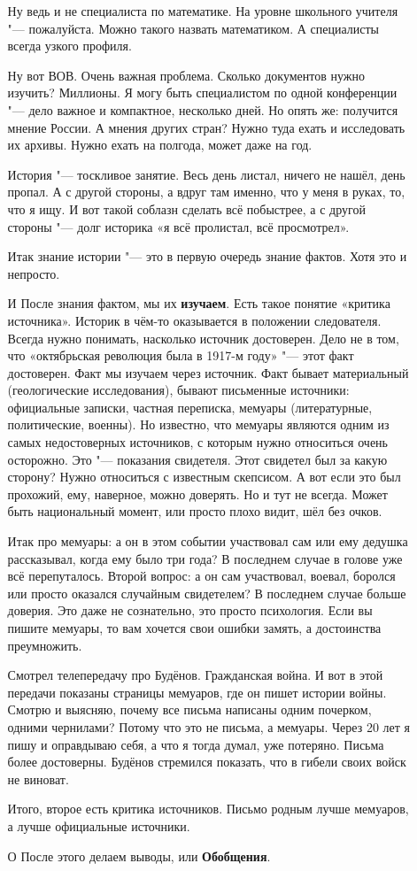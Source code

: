 \begin{enumerate}
\begin{itemize}
Ну ведь и не специалиста по математике. На уровне школьного учителя "--- пожалуйста. Можно такого назвать математиком. А специалисты всегда узкого профиля.

Ну вот ВОВ. Очень важная проблема. Сколько документов нужно изучить? Миллионы. Я могу быть специалистом по одной конференции "--- дело важное и компактное, несколько дней. Но опять же: получится мнение России. А мнения других стран? Нужно туда ехать и исследовать их архивы. Нужно ехать на полгода, может даже на год.

История "--- тоскливое занятие. Весь день листал, ничего не нашёл, день пропал. А с другой стороны, а вдруг там именно, что у меня в руках, то, что я ищу. И вот такой соблазн сделать всё побыстрее, а с другой стороны "--- долг историка «я всё пролистал, всё просмотрел».

Итак знание истории "--- это в первую очередь знание фактов. Хотя это и непросто.
\item[И] После знания фактом, мы их \textbf{изучаем}. Есть такое понятие «критика источника». Историк в чём-то оказывается в положении следователя. Всегда нужно понимать, насколько источник достоверен. Дело не в том, что «октябрьская революция была в 1917-м году» "--- этот факт достоверен. Факт мы изучаем через источник. Факт бывает материальный (геологические исследования), бывают письменные источники: официальные записки, частная переписка, мемуары (литературные, политические, военны). Но известно, что мемуары являются одним из самых недостоверных источников, с которым нужно относиться очень осторожно. Это "--- показания свидетеля. Этот свидетел был за какую сторону? Нужно относиться с известным скепсисом. А вот если это был прохожий, ему, наверное, можно доверять. Но и тут не всегда. Может быть национальный момент, или просто плохо видит, шёл без очков.

Итак про мемуары: а он в этом событии участвовал сам или ему дедушка рассказывал, когда ему было три года? В последнем случае в голове уже всё перепуталось. Второй вопрос: а он сам участвовал, воевал, боролся или просто оказался случайным свидетелем? В последнем случае больше доверия. Это даже не сознательно, это просто психология. Если вы пишите мемуары, то вам хочется свои ошибки замять, а достоинства преумножить.

Смотрел телепередачу про Будёнов. Гражданская война. И вот в этой передачи показаны страницы мемуаров, где он пишет истории войны. Смотрю и выясняю, почему все письма написаны одним почерком, одними чернилами? Потому что это не письма, а мемуары. Через 20 лет я пишу и оправдываю себя, а что я тогда думал, уже потеряно. Письма более достоверны. Будёнов стремился показать, что в гибели своих войск не виноват.

Итого, второе есть критика источников. Письмо родным лучше мемуаров, а лучше официальные источники.
\item[О] После этого делаем выводы, или \textbf{Обобщения}.
\end{itemize}
\end{enumerate}
